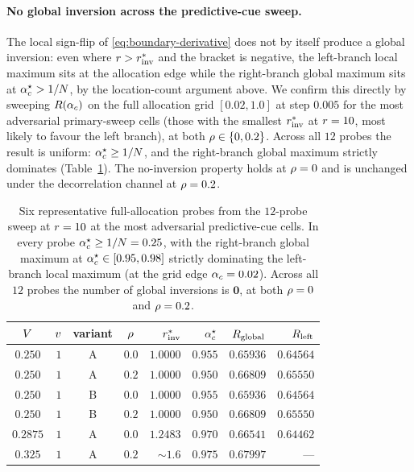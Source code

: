 \paragraph{No global inversion across the predictive-cue sweep.}
The local sign-flip of \eqref{eq:boundary-derivative} does not by itself
produce a global inversion: even where $r > r^{*}_{\mathrm{inv}}$ and the
bracket is negative, the left-branch local maximum sits at the
allocation edge while the right-branch global maximum sits at
$\alpha_c^\star > 1/N$, by the location-count argument above. We
confirm this directly by sweeping $R(\alpha_c)$ on the full
allocation grid $[0.02, 1.0]$ at step $0.005$ for the most adversarial
primary-sweep cells (those with the smallest $r^{*}_{\mathrm{inv}}$ at $r =
10$, most likely to favour the left branch), at both $\rho \in \{0,
0.2\}$. Across all $12$ probes the result is uniform:
$\alpha_c^\star \ge 1/N$, and the right-branch global maximum
strictly dominates (Table~\ref{tab:noninv-sweep}). The no-inversion
property holds at $\rho = 0$ and is unchanged under the decorrelation
channel at $\rho = 0.2$.
%
\begin{table}[t]
  \centering
  \small
  \begin{tabular}{c r c c r r r r}
    \toprule
    $V$ & $v$ & variant & $\rho$ &
    $r^{*}_{\mathrm{inv}}$ & $\alpha_c^\star$ &
    $R_{\mathrm{global}}$ & $R_{\mathrm{left}}$ \\
    \midrule
    $0.250$  & $1$ & A & $0.0$ & $1.0000$    & $0.955$ &
    $0.65936$ & $0.64564$ \\
    $0.250$  & $1$ & A & $0.2$ & $1.0000$    & $0.950$ &
    $0.66809$ & $0.65550$ \\
    $0.250$  & $1$ & B & $0.0$ & $1.0000$    & $0.955$ &
    $0.65936$ & $0.64564$ \\
    $0.250$  & $1$ & B & $0.2$ & $1.0000$    & $0.950$ &
    $0.66809$ & $0.65550$ \\
    $0.2875$ & $1$ & A & $0.0$ & $1.2483$    & $0.970$ &
    $0.66541$ & $0.64462$ \\
    $0.325$  & $1$ & A & $0.2$ & $\sim\!1.6$ & $0.975$ &
    $0.67997$ & --- \\
    \bottomrule
  \end{tabular}
  \caption{Six representative full-allocation probes from the $12$-probe
  sweep at $r = 10$ at the most adversarial predictive-cue cells.
  In every probe $\alpha_c^\star \ge 1/N = 0.25$, with the
  right-branch global maximum at $\alpha_c^\star \in [0.95, 0.98]$
  strictly dominating the left-branch local maximum (at the grid edge
  $\alpha_c = 0.02$). Across all $12$ probes the number of global
  inversions is $\mathbf{0}$, at both $\rho = 0$ and $\rho = 0.2$.}
  \label{tab:noninv-sweep}
\end{table}
